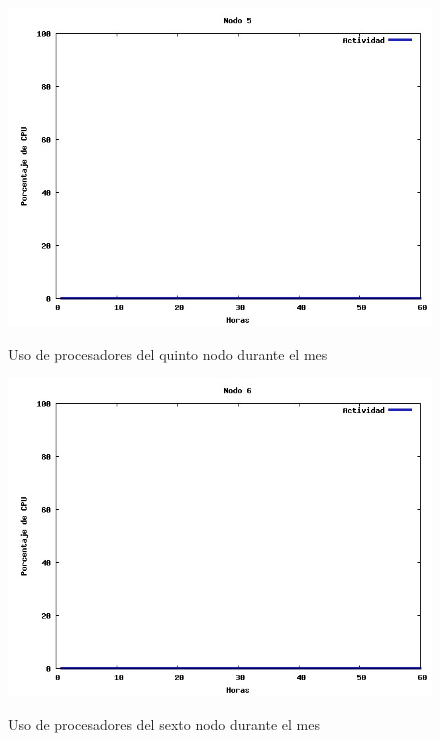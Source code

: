 \documentclass[11pt,a4paper,oneside,openany]{report}
\begin{document}
\begin{figure}[htb]
\centering
\includegraphics[width=0.9\linewidth]{grafico5.jpg}\\
\caption{Uso de procesadores del quinto nodo durante el mes}
\end{figure}

\begin{figure}[htb]
\centering
\includegraphics[width=0.9\linewidth]{grafico6.jpg}\\
\caption{Uso de procesadores del sexto nodo durante el mes}
\end{figure}
\end{document}
